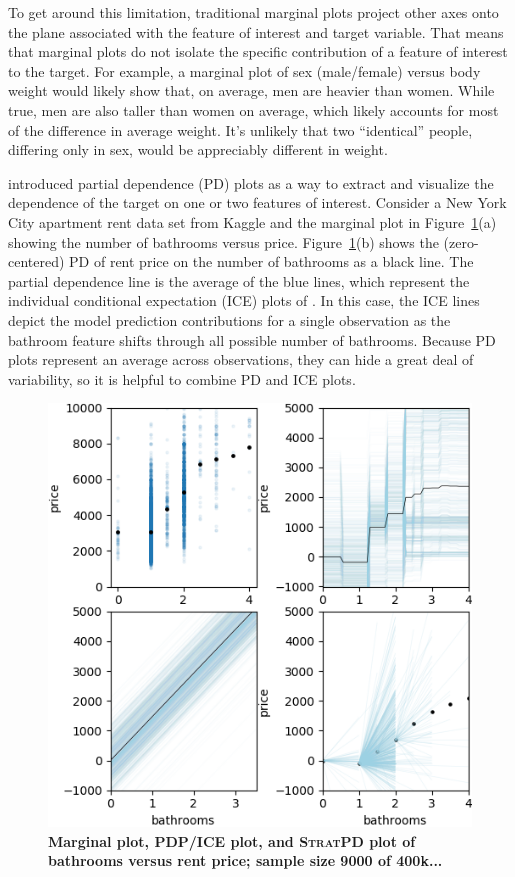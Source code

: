 \documentclass[12pt]{article}
\newcommand{\figref}[1]{Figure~\ref{#1}}
\newcommand{\spd}{\fontfamily{cmr}\textsc{\small StratPD}}
\begin{document}
To get around this limitation, traditional marginal plots project other axes onto the plane associated with the feature of interest and target variable.  That means that marginal plots do not isolate the specific contribution of a feature of interest to the target. For example, a marginal plot of sex (male/female) versus body weight would likely show that, on average, men are heavier than women. While true, men are also taller than women on average, which likely accounts for most of the difference in average weight. It's unlikely that two ``identical'' people, differing only in sex, would be appreciably different in weight.  

\cite{PDP} introduced partial dependence (PD) plots as a way to extract and visualize the dependence of the target on one or two features of interest.  Consider a New York City apartment rent data set from Kaggle \cite{rent-dataset} and the marginal plot in \figref{fig:baths_price}(a) showing the number of bathrooms versus price.  \figref{fig:baths_price}(b) shows the (zero-centered) PD of rent price on the number of bathrooms as a black line. The partial dependence line is the average of the blue lines, which represent the individual conditional expectation (ICE) plots of \cite{ICE}.  In this case, the ICE lines depict the model prediction contributions for a single observation as the bathroom feature shifts through all possible number of bathrooms. Because PD plots represent an average across observations, they can hide a great deal of variability, so it is helpful to combine PD and ICE plots.

\begin{figure}[htbp]
\begin{center}
\includegraphics[scale=0.7]{images/bathrooms_vs_price.png}
\caption{{\bf  Marginal plot, PDP/ICE plot, and \spd{} plot of bathrooms versus rent price; sample size 9000 of 400k...}}
\label{fig:baths_price}
\end{center}
\end{figure}
\end{document}
